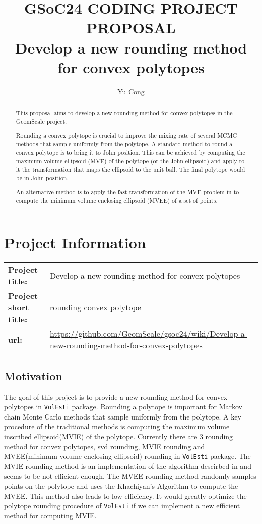 \documentclass[11pt]{article}
\title{GSoC24 CODING PROJECT PROPOSAL \\ Develop a new rounding method for convex polytopes}
\author{Yu Cong}
\begin{document}
\maketitle
\begin{abstract}
    This proposal aims to develop a new rounding method for convex polytopes in the GeomScale project. 
    
    Rounding a convex polytope is crucial to improve the mixing rate of several MCMC methods that sample uniformly from the polytope. A standard method to round a convex polytope is to bring it to John position. This can be achieved by computing the maximum volume ellipsoid (MVE) of the polytope (or the John ellipsoid) and apply to it the transformation that maps the ellipsoid to the unit ball. The final polytope would be in John position.

    An alternative method is to apply the fast transformation of the MVE problem in \cite{Khachiyan_Todd_1993} to compute the minimum volume enclosing ellipsoid (MVEE) of a set of points.
\end{abstract}
\tableofcontents

\section{Project Information}
\begin{table}[H]
    \large
    \begin{tabular}{l p{12cm}}
        \textbf{Project title:} & Develop a new rounding method for convex polytopes\\ 
        \textbf{Project short title:} & rounding convex polytope\\
        \textbf{url:} & \url{https://github.com/GeomScale/gsoc24/wiki/Develop-a-new-rounding-method-for-convex-polytopes}\\
    \end{tabular}%
\end{table}

\subsection{Motivation}
The goal of this project is to provide a new rounding method for convex polytopes in \texttt{VolEsti} package. Rounding a polytope is important for Markov chain Monte Carlo methods that sample uniformly from the polytope. A key procedure of the traditional methods is computing the maximum volume inscribed ellipsoid(MVIE) of the polytope.
Currently there are 3 rounding method for convex polytopes, svd rounding, MVIE rounding and MVEE(minimum volume enclosing ellipsoid) rounding in \texttt{VolEsti} package. The MVIE rounding method is an implementation of the algorithm descirbed in \cite{Zhang_Gao_2003} and seems to be not efficient enough. The MVEE rounding method randomly samples points on the polytope and uses the Khachiyan's Algorithm\cite{Khachiyan_1996} to compute the MVEE. This method also leads to low efficiency. It would greatly optimize the polytope rounding procedure of \texttt{VolEsti} if we can implement a new efficient method for computing MVIE.
\end{document}
